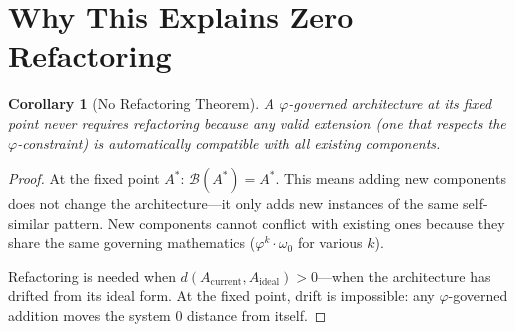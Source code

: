 \documentclass[12pt]{article}
\newtheorem{corollary}[theorem]{Corollary}
\newcommand{\PHI}{\varphi}
\newcommand{\Build}{\mathcal{B}}
\begin{document}
\section{Why This Explains Zero Refactoring}

\begin{corollary}[No Refactoring Theorem]
A $\PHI$-governed architecture at its fixed point never requires refactoring because any valid extension (one that respects the $\PHI$-constraint) is automatically compatible with all existing components.
\end{corollary}

\begin{proof}
At the fixed point $A^*$: $\Build(A^*) = A^*$. This means adding new components does not change the architecture—it only adds new instances of the same self-similar pattern. New components cannot conflict with existing ones because they share the same governing mathematics ($\PHI^k \cdot \omega_0$ for various $k$).

Refactoring is needed when $d(A_{\text{current}}, A_{\text{ideal}}) > 0$—when the architecture has drifted from its ideal form. At the fixed point, drift is impossible: any $\PHI$-governed addition moves the system 0 distance from itself.
\end{proof}
\end{document}
